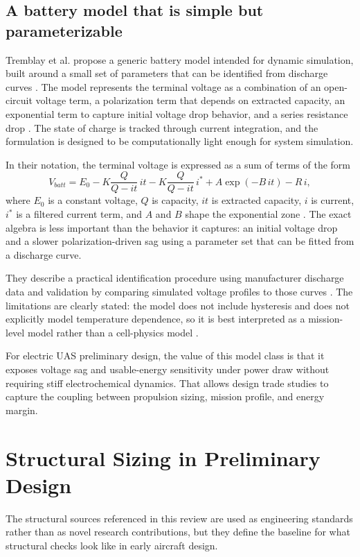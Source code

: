 \section{A battery model that is simple but parameterizable}
Tremblay et al. propose a generic battery model intended for dynamic simulation, built around a small set of parameters that can be identified from discharge curves \cite{Tremblay2007Battery}. The model represents the terminal voltage as a combination of an open-circuit voltage term, a polarization term that depends on extracted capacity, an exponential term to capture initial voltage drop behavior, and a series resistance drop \cite{Tremblay2007Battery}. The state of charge is tracked through current integration, and the formulation is designed to be computationally light enough for system simulation.

In their notation, the terminal voltage is expressed as a sum of terms of the form
\[
V_{batt} = E_0 - K\frac{Q}{Q - it}\,it - K\frac{Q}{Q - it}\,i^* + A\exp(-B\,it) - R\,i,
\]
where $E_0$ is a constant voltage, $Q$ is capacity, $it$ is extracted capacity, $i$ is current, $i^*$ is a filtered current term, and $A$ and $B$ shape the exponential zone \cite{Tremblay2007Battery}. The exact algebra is less important than the behavior it captures: an initial voltage drop and a slower polarization-driven sag using a parameter set that can be fitted from a discharge curve.

They describe a practical identification procedure using manufacturer discharge data and validation by comparing simulated voltage profiles to those curves \cite{Tremblay2007Battery}. The limitations are clearly stated: the model does not include hysteresis and does not explicitly model temperature dependence, so it is best interpreted as a mission-level model rather than a cell-physics model \cite{Tremblay2007Battery}.

For electric UAS preliminary design, the value of this model class is that it exposes voltage sag and usable-energy sensitivity under power draw without requiring stiff electrochemical dynamics. That allows design trade studies to capture the coupling between propulsion sizing, mission profile, and energy margin.

\chapter{Structural Sizing in Preliminary Design}
The structural sources referenced in this review are used as engineering standards rather than as novel research contributions, but they define the baseline for what structural checks look like in early aircraft design.

